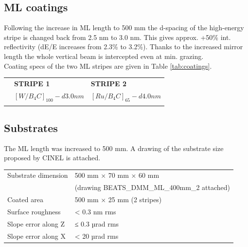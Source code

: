 \subsection{ML coatings}
Following the increase in ML length to 500 mm the d-spacing of the high-energy stripe is changed back from 2.5 nm to 3.0 nm. This gives approx. +50\% int. reflectivity (dE/E increases from 2.3\% to 3.2\%). Thanks to the increased mirror length the whole vertical beam is intercepted even at min. grazing. \\
Coating specs of the two ML stripes are given in Table \ref{tab:coatings}.
\begin{center}
\begin{tabular}[bhp]{|p{} | p{} | p{} |}
\hline
 & \textbf{STRIPE 1} & \textbf{STRIPE 2} \\
 & \textbf{$[W/B_{4}C]_{100} - d 3.0 nm $} & \textbf{$[Ru/B_{4}C]_{65} - d 4.0 nm $} \\
\hline
\label{tab:coatings}
\end{tabular}
\end{center}

\subsection{Substrates}
The ML length was increased to 500 mm. A drawing of the substrate size proposed by CINEL is attached.

\begin{center}
\begin{tabular}[bhp]{|p{} | p{}|}
\hline
Substrate dimension & 500 mm × 70 mm × 60 mm \\
 & (drawing BEATS_DMM_ML_400mm_2 attached) \\
Coated area & 500 mm × 25 mm (2 stripes) \\
Surface roughness & < 0.3 nm rms \\
Slope error along Z & ≤ 0.3 µrad rms \\
Slope error along X & < 20 µrad rms \\
\hline
\end{tabular}
\end{center}



\clearpage


